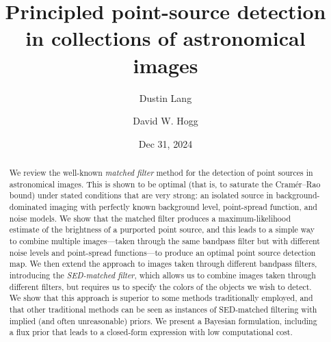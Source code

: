 \documentclass[11pt,letterpaper,linenumbers]{aastex63}
\begin{document}
\title{Principled point-source detection in collections of astronomical images}
\author{Dustin Lang}
\author{David W. Hogg}
\date{Dec 31, 2024}

\begin{abstract}
We review the well-known \emph{matched filter} method for the
detection of point sources in astronomical images.  This is shown to
be optimal (that is, to saturate the Cram\'er--Rao bound) under stated
conditions that are very strong: an isolated source in
background-dominated imaging with perfectly known background level,
point-spread function, and noise models.  We show that the matched
filter produces a maximum-likelihood estimate of the brightness of a
purported point source, and this leads to a simple way to combine
multiple images---taken through the same bandpass filter but with
different noise levels and point-spread functions---to produce an
optimal point source detection map.  We then extend the approach to
images taken through different bandpass filters, introducing the
\emph{SED-matched filter}, which allows us to combine images taken
through different filters, but requires us to specify the colors of
the objects we wish to detect.  We show that this approach is superior
to some methods traditionally employed, and that other traditional
methods can be seen as instances of SED-matched filtering with implied
(and often unreasonable) priors.
We present a Bayesian formulation, including a flux prior that leads to
a closed-form expression with low computational cost.
\end{abstract}
\end{document}
